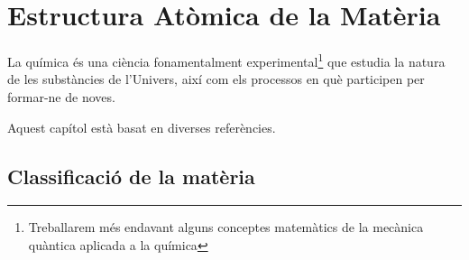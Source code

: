 \chapter{Estructura Atòmica de la Matèria}
La química és una ciència fonamentalment experimental\footnote{Treballarem més endavant alguns conceptes matemàtics de la mecànica quàntica aplicada a la química} que estudia la natura de les substàncies de l'Univers, així com els processos en què participen per formar-ne de noves.

Aquest capítol està basat en diverses referències.\cite{caamano_ros_quimica_1991,mahan_quimico_1977,yen_chemistry_2008}

\section{Classificació de la matèria}

